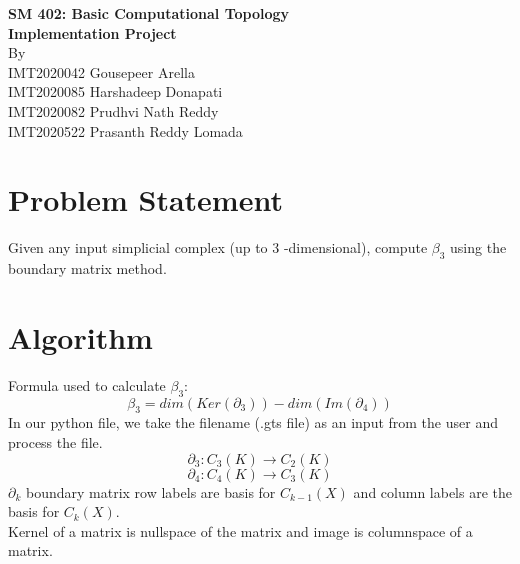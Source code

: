 \documentclass[11pt]{article}
\begin{document}
\begin{titlepage}
\begin{center}
\vspace*{0.5cm}
\Large{\textbf{SM 402: Basic Computational Topology}}\\
\Large{\textbf{Implementation Project}}\\
\vfill
\vfill
By \\ 
IMT2020042 Gousepeer Arella \\
IMT2020085 Harshadeep Donapati \\
IMT2020082 Prudhvi Nath Reddy \\
IMT2020522 Prasanth Reddy Lomada \\
\end{center}
\end{titlepage}

\tableofcontents
\thispagestyle{empty}
\clearpage
\setcounter{page}{1}

\section{Problem Statement}
Given any input simplicial complex (up to 3 -dimensional), compute $\beta_3$ 
using the boundary matrix method.

\section{Algorithm}
Formula used to calculate $\beta_3$: \\
\begin{equation}
    \beta_3 = dim(Ker(\partial_3)) - dim(Im(\partial_4))
\end{equation}
In our python file, we take the filename (.gts file) as an input from the user and process the file.
\begin{equation*}
    \partial_3 : C_{3}(K) \to C_{2}(K) 
\end{equation*}
\begin{equation*}
    \partial_4 : C_{4}(K) \to C_{3}(K)
\end{equation*}
$\partial_k$ boundary matrix row labels are basis for $C_{k-1}(X)$ and column labels are the basis for $C_{k}(X)$.  \\
Kernel of a matrix is nullspace of the matrix and image is columnspace of a matrix.
\end{document}
